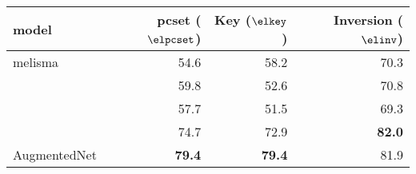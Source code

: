 \begin{tabular}{l|rrr}
model          & \gls{pcset} ($\elpcset$) & Key ($\elkey$) & Inversion ($\elinv$)  \\ \hline
\gls{melisma}        & 54.6 & 58.2 & 70.3 \\
\textcite{chen2021attend}       & 59.8 & 52.6 & 70.8 \\
\textcite{mcleod2021modular}     & 57.7 & 51.5 & 69.3 \\
\textcite{micchi2021deep}     & 74.7 & 72.9 & \textbf{82.0} \\
\gls{AugmentedNet} & \textbf{79.4} & \textbf{79.4} & 81.9
\end{tabular}
